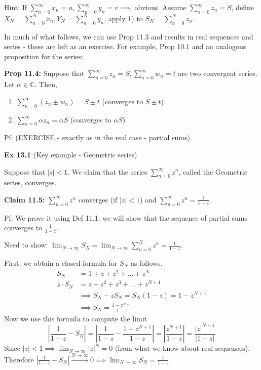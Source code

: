 \documentclass{article}
\begin{document}
Hint: If $\sum_{n=0}^{\infty} x_n = u, \sum_{n=0}^{\infty} y_n = v \implies$ obvious. Assume $\sum_{n=0}^{\infty} z_n = S$, define $X_N = \sum_{n=0}^{N} x_n, Y_N = \sum_{n=0}^{N} y_n$, apply 1) to $S_N = \sum_{n=0}^{N} z_n$.

In much of what follows, we can use Prop 11.3 and results in real sequences and series - these are left as an exercise. For example, Prop 10.1 and an analogous proposition for the series:

\textbf{Prop 11.4:} Suppose that $\sum_{n=0}^{\infty} z_n = S, \sum_{n=0}^{\infty} w_n = t$ are two convergent series. Let $\alpha \in \mathbb{C}$. Then,
\begin{enumerate}
    \item $\sum_{n=0}^{\infty} (z_n \pm w_n) = S \pm t$ (converges to $S \pm t$)
    
    \item $\sum_{n=0}^{\infty} \alpha z_n = \alpha S$ (converges to $\alpha S$)
\end{enumerate}

Pf: (EXERCISE - exactly as in the real case - partial sums).

\textbf{Ex 13.1} (Key example - Geometric series)

Suppose that $|z| < 1$. We claim that the series $\sum_{n=0}^{\infty} z^n$, called the Geometric series, converges.

\textbf{Claim 11.5:} $\sum_{n=0}^{\infty} z^n$ converges (if $|z| < 1$) and $\sum_{n=0}^{\infty} z^n = \frac{1}{1-z}$.

Pf: We prove it using Def 11.1: we will show that the sequence of partial sums converges to $\frac{1}{1-z}$.

Need to show: $\lim_{N \to \infty} S_N = \lim_{N \to \infty} \sum_{n=0}^{N} z^n = \frac{1}{1-z}$.

First, we obtain a closed formula for $S_N$ as follows.
\begin{align*}
    S_N &= 1 + z + z^2 + \dots + z^N \\
    z \cdot S_N &= z + z^2 + z^3 + \dots + z^{N+1} \\
    &\implies S_N - zS_N = S_N(1-z) = 1 - z^{N+1} \\
    &\implies S_N = \frac{1 - z^{N+1}}{1-z}
\end{align*}
Now we use this formula to compute the limit
$$ \left| \frac{1}{1-z} - S_N \right| = \left| \frac{1}{1-z} - \frac{1 - z^{N+1}}{1-z} \right| = \left| \frac{z^{N+1}}{1-z} \right| = \frac{|z|^{N+1}}{|1-z|} $$
Since $|z| < 1 \implies \lim_{N \to \infty} |z|^N = 0$ (from what we know about real sequences). Therefore $\left| \frac{1}{1-z} - S_N \right| \xrightarrow{N \to \infty} 0 \implies \lim_{N \to \infty} S_N = \frac{1}{1-z}$.
\end{document}

